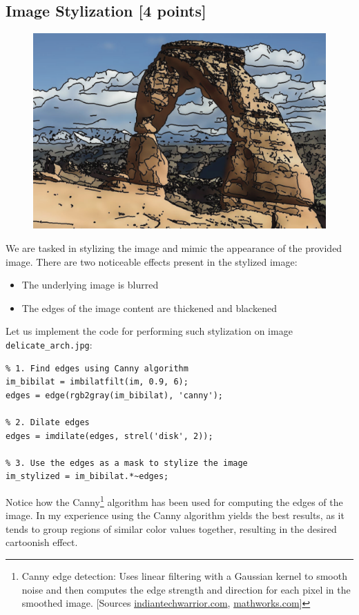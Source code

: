 \documentclass[tikz,14pt,fleqn]{article}
\begin{document}
\subsection{Image Stylization [4 points]}
\begin{figure}
    \centering
    \vspace*{-0.5cm}
    \includegraphics[width=1\linewidth]{fig/6.1.goal.png}
    \label{fig:1.1}
\end{figure}
We are tasked in stylizing the image and mimic the appearance of the provided image. There are two noticeable effects present in the stylized image:
\begin{itemize}
    \item The underlying image is blurred
    \item The edges of the image content are thickened and blackened
\end{itemize}
Let us implement the code for performing such stylization on image \verb|delicate_arch.jpg|:
\vspace*{-1cm}
\begin{verbatim}
% 1. Find edges using Canny algorithm
im_bibilat = imbilatfilt(im, 0.9, 6);
edges = edge(rgb2gray(im_bibilat), 'canny');

% 2. Dilate edges
edges = imdilate(edges, strel('disk', 2));

% 3. Use the edges as a mask to stylize the image
im_stylized = im_bibilat.*~edges;
\end{verbatim}
Notice how the Canny\footnote{Canny edge detection: Uses linear filtering with a Gaussian kernel to smooth noise and then computes the edge strength and direction for each pixel in the smoothed image. [Sources \href{https://indiantechwarrior.com/canny-edge-detection-for-image-processing/}{indiantechwarrior.com}, \href{https://ch.mathworks.com/help/images/ref/edge.html}{mathworks.com}]} algorithm has been used for computing the edges of the image. In my experience using the Canny algorithm yields the best results, as it tends to group regions of similar color values together, resulting in the desired cartoonish effect.
\end{document}
